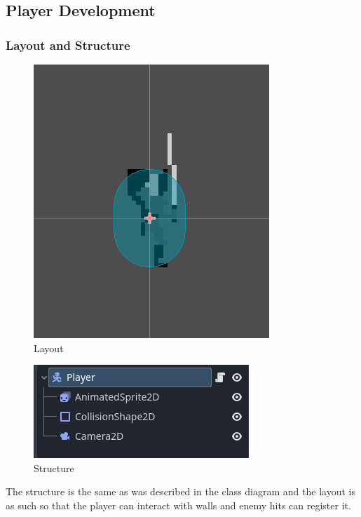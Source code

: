 \documentclass{article}
\begin{document}
        \subsection{Player Development}
        \subsubsection{Layout and Structure}
        \begin{multicols}{2}
                \begin{figure}[H]
                        \centering
                        \includegraphics{images/development/Player_layout.png}
                        \caption{Layout}
                \end{figure}
                \begin{figure}[H]
                        \centering
                        \includegraphics[width = 0.8\columnwidth]{images/development/Player_structure.png}
                        \caption{Structure}
                \end{figure}
        \end{multicols}
        \noindent The structure is the same as was described in the class diagram and the layout is as such so that the player can interact with walls and enemy hits can register it.\\
\end{document}

